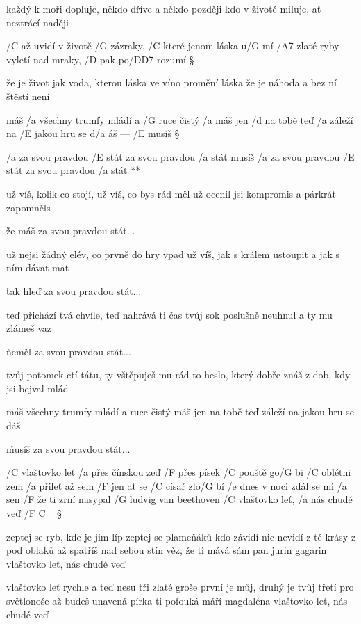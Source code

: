 každý k moři dopluje, někdo dříve a někdo později
kdo v životě miluje, ať neztrácí naději \s

/C až uvidí v životě /G zázraky, /C které jenom láska u/G mí
/A7 zlaté ryby vyletí nad mraky, /D pak po/{D\dim D7} rozumí \S

že je život jak voda, kterou láska ve víno promění
láska že je náhoda a bez ní štěstí není




máš /a všechny trumfy mládí a /G ruce čistý /a máš
jen /d na tobě teď /a záleží na /E jakou hru se d/a áš --- /E musíš \S

\R /a za svou pravdou /E stát
   za svou pravdou /a stát
   musíš /a za svou pravdou /E stát
   za svou pravdou /a stát **

už víš, kolik co stojí, už víš, co bys rád měl
už ocenil jsi kompromis a párkrát zapomněls \s

\r že máš za svou pravdou stát...

už nejsi žádný elév, co prvně do hry vpad
už víš, jak s králem ustoupit a jak s ním dávat mat \s

\r tak hleď za svou pravdou stát...

teď přichází tvá chvíle, teď nahrává ti čas
tvůj  sok poslušně neuhnul a ty  mu zlámeš vaz \s

\r neměl za svou pravdou stát...

tvůj potomek ctí tátu, ty vštěpuješ mu rád
to heslo, který dobře znáš z dob, kdy jsi bejval mlád \s

máš všechny trumfy mládí a ruce čistý máš
jen na tobě teď záleží na jakou hru se dáš \s

\r musíš za svou pravdou stát...




/C vlaštovko leť /a přes čínskou zeď
/F přes písek /C pouště go/G bi
/C oblétni zem /a přileť až sem
/F jen ať se /C císař zlo/G bí
/e dnes v noci zdál se mi /a sen
/F že ti zrní nasypal /G ludvig van beethoven
/C vlaštovko leť, /a nás chudé veď /{F C} {\ } \S

zeptej se ryb, kde je jim líp
zeptej se plameňáků
kdo závidí nic nevidí
z té krásy z pod oblaků
až spatříš nad sebou stín
věz, že ti mává sám pan jurin gagarin
vlaštovko leť, nás chudé veď \s

vlaštovko leť rychle a teď
nesu tři zlaté groše
první je můj, druhý je tvůj
třetí pro světlonoše
až budeš unavená
pírka ti pofouká máří magdaléna
vlaštovko leť, nás chudé veď \s



